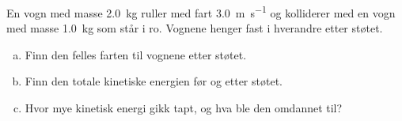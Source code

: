 %
En vogn med masse \SI{2.0}{\kilo\gram} ruller med fart \SI{3.0}{\metre\per\second} og kolliderer med en vogn med masse \SI{1.0}{\kilo\gram} som står i ro. Vognene henger fast i hverandre etter støtet.
\begin{enumerate}[a)]
    \item Finn den felles farten til vognene etter støtet.
    \item Finn den totale kinetiske energien før og etter støtet.
    \item Hvor mye kinetisk energi gikk tapt, og hva ble den omdannet til?
\end{enumerate}
